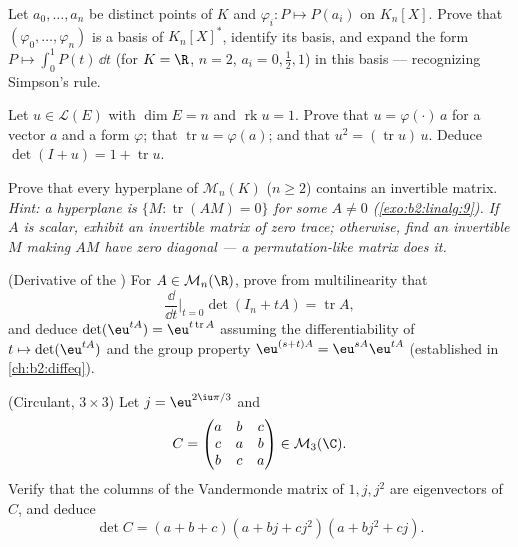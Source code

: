 \begin{exercise}[$\star\star$]\label{exo:b2:linalg:4}
Let $a_0, \dots, a_n$ be distinct points of $K$ and $\varphi_i \colon
P \mapsto P(a_i)$ on $K_n[X]$. Prove that $(\varphi_0, \dots,
\varphi_n)$ is a basis of $K_n[X]^*$, identify its  basis,
and expand the form $P \mapsto \int_0^1 P(t)\,\dd t$ (for $K = \R$,
$n = 2$, $a_i = 0, \frac12, 1$) in this basis --- recognizing
Simpson's rule.
\end{exercise}

\begin{exercise}[$\star\star$]\label{exo:b2:linalg:5}
Let $u \in \mathcal{L}(E)$ with $\dim E = n$ and $\operatorname{rk} u
= 1$. Prove that $u = \varphi(\cdot)\, a$ for a vector $a$ and a
form $\varphi$; that $\operatorname{tr} u = \varphi(a)$; and that
$u^2 = (\operatorname{tr} u)\, u$. Deduce $\det(I + u) = 1 +
\operatorname{tr} u$.
\end{exercise}

\begin{exercise}[$\star\star$]\label{exo:b2:linalg:6}
Prove that every hyperplane of $\mathcal{M}_n(K)$ ($n \geq 2$)
contains an invertible matrix. \emph{Hint: a hyperplane is $\{M :
\operatorname{tr}(AM) = 0\}$ for some $A \neq 0$
(\cref{exo:b2:linalg:9}). If $A$ is scalar, exhibit an invertible
matrix of zero trace; otherwise, find an invertible $M$ making
$AM$ have zero diagonal --- a permutation-like matrix does it.}
\end{exercise}

\begin{exercise}[$\star\star$]\label{exo:b2:linalg:7}
(Derivative of the ) For $A \in \mathcal{M}_n(\R)$, prove
from multilinearity that
\[
\frac{\dd}{\dd t}\Big|_{t=0} \det(I_n + tA) = \operatorname{tr} A ,
\]
and deduce $\det(\eu^{tA}) = \eu^{t\operatorname{tr} A}$ assuming
the differentiability of $t \mapsto \det(\eu^{tA})$ and the group
property $\eu^{(s+t)A} = \eu^{sA}\eu^{tA}$ (established in
\cref{ch:b2:diffeq}).
\end{exercise}

\begin{exercise}[$\star\star$]\label{exo:b2:linalg:8}
(Circulant, $3 \times 3$) Let $j = \eu^{2\iu\pi/3}$ and
\[
C = \begin{pmatrix}
a & b & c\\
c & a & b\\
b & c & a
\end{pmatrix} \in \mathcal{M}_3(\C).
\]
Verify that the columns of the Vandermonde matrix of $1, j, j^2$ are
eigenvectors of $C$, and deduce
\[
\det C = (a + b + c)(a + bj + cj^2)(a + bj^2 + cj).
\]
\end{exercise}


